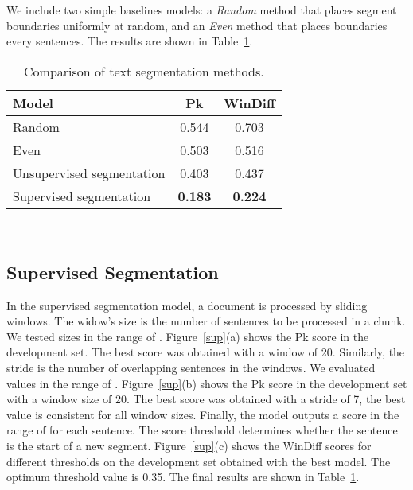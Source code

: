\documentclass[sigconf]{acmart}
\begin{document}
We include two simple baselines models: a \emph{Random} method that places segment boundaries uniformly at random, and an \emph{Even} method that places boundaries every  sentences. The results are shown in Table~\ref{tab:results:unsup2}.

\begin{table}
	\centering
\begin{tabular}{l c c } 
		\toprule
		\textbf{Model} & \textbf{Pk}	&  \textbf{WinDiff} \\ \hline
        Random&	0.544&	0.703\\
        Even&	0.503&	0.516\\
        Unsupervised segmentation & 0.403&	0.437\\ 
        Supervised segmentation & \textbf{0.183} &	\textbf{0.224}\\
        \bottomrule
    \end{tabular} 
\caption{Comparison of text segmentation methods.}
	\label{tab:results:unsup2}
\end{table}

\begin{figure*}[ht]
 \hspace{\fill}
    \hspace{\fill}
   \\
\caption{Hyper-parameter tuning for the supervised segmentation model. (a) Window; (b) Stride; (c) Threshold.}
\label{sup}
\end{figure*}

\subsection{Supervised Segmentation}
In the supervised segmentation model, a document is processed by sliding windows. The widow’s size is the number of sentences to be processed in a chunk. We tested sizes in the range of . Figure~\ref{sup}(a) shows the Pk score in the development set. The best score was obtained with a window of 20. Similarly, the stride is the number of overlapping sentences in the windows. We evaluated values in the range of . Figure~\ref{sup}(b) shows the Pk score in the development set with a window size of 20. The best score was obtained with a stride of 7, the best value is consistent for all window sizes. Finally, the model outputs a score in the range of  for each sentence. The score threshold determines whether the sentence is the start of a new segment. Figure~\ref{sup}(c) shows the WinDiff scores for different thresholds on the development set obtained with the best model. The optimum threshold value is 0.35. The final results are shown in Table~\ref{tab:results:unsup2}.
\end{document}
